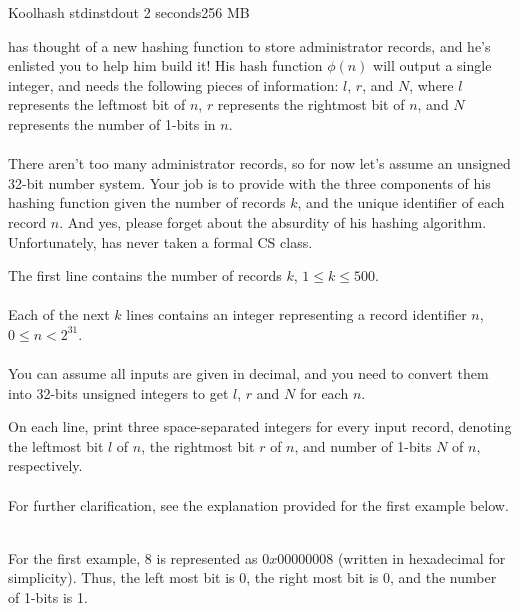 \begin{problem}{Koolhash}
{stdin}{stdout}
{2 seconds}{256 MB}{}

\T has thought of a new hashing function to store administrator records, and he's enlisted you to help him build it! His hash function $\phi(n)$ will output a single integer, and needs the following pieces of information: $l$, $r$, and $N$, where $l$ represents the leftmost bit of  $n$, $r$ represents the rightmost bit of $n$, and $N$ represents the number of 1-bits in $n$. \\ \\
There aren't too many administrator records, so for now let's assume an unsigned 32-bit number system. Your job is to provide \T with the three components of his hashing function given the number of records $k$, and the unique identifier of each record $n$. And yes, please forget about the absurdity of his hashing algorithm. Unfortunately, \T has never taken a formal CS class.

\InputFile
The first line contains the number of records $k$, $1 \leq k \leq 500$. \\ \\
Each of the next $k$ lines contains an integer representing a record identifier $n$, $0 \leq n < 2^{31}$.\\ \\
You can assume all inputs are given in decimal, and you need to convert them into 32-bits unsigned integers to get $l$, $r$ and $N$ for each $n$.

\OutputFile
On each line, print three space-separated integers for every input record, denoting the leftmost bit $l$ of $n$, the rightmost bit $r$ of $n$, and number of 1-bits $N$ of $n$, respectively. \\ \\

For further clarification, see the explanation provided for the first example below.
\Examples

\begin{example}
%
\end{example}

\begin{example}
%
\end{example} \\
\Explanation
For the first example, $8$ is represented as $0x00000008$ (written in hexadecimal for simplicity). Thus, the left most bit is 0, the right most bit is 0, and the number of 1-bits is 1.
\end{problem}
